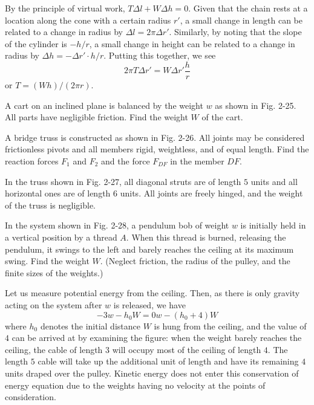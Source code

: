 \documentclass[../feynman-lectures-on-physics.tex]{subfiles}
\begin{document}
\begin{questions}
\begin{solution}
	By the principle of virtual work, $T\Delta{l} + W\Delta{h} = 0$. Given that the chain rests at a location along the cone with a certain radius $r'$, a small change in length can be related to a change in radius by $\Delta{l} = 2\pi\Delta{r'}$. Similarly, by noting that the slope of the cylinder is $-h/r$, a small change in height can be related to a change in radius by $\Delta{h} = -\Delta{r'}\cdot{h}/r$. Putting this together, we see
	\[
	2\pi{T}\Delta{r'} = W\Delta{r'}\frac{h}{r}
	\] 
	or $T = (Wh)/(2\pi{r})$.
\end{solution}

\question A cart on an inclined plane is balanced by the weight $w$ as shown in Fig. 2-25. All parts have negligible friction. Find the weight $W$ of the cart.

\question A bridge truss is constructed as shown in Fig. 2-26. All joints may be considered frictionless pivots and all members rigid, weightless, and of equal length. Find the reaction forces $F_1$ and $F_2$ and the force $F_{DF}$ in the member $DF$.

\question In the truss shown in Fig. 2-27, all diagonal struts are of length $5$ units and all horizontal ones are of length $6$ units. All joints are freely hinged, and the weight of the truss is negligible.

\question In the system shown in Fig. 2-28, a pendulum bob of weight $w$ is initially held in a vertical position by a thread $A$. When this thread is burned, releasing the pendulum, it swings to the left and barely reaches the ceiling at its maximum swing. Find the weight $W$. (Neglect friction, the radius of the pulley, and the finite sizes of the weights.)

\begin{solution}
	Let us measure potential energy from the ceiling. Then, as there is only gravity acting on the system after $w$ is released, we have
	\[
		-3w - h_0W = 0w - (h_0 + 4)W
	\] 
	where $h_0$ denotes the initial distance $W$ is hung from the ceiling, and the value of $4$ can be arrived at by examining the figure: when the weight barely reaches the ceiling, the cable of length $3$ will occupy most of the ceiling of length $4$. The length $5$ cable will take up the additional unit of length and have its remaining $4$ units draped over the pulley. Kinetic energy does not enter this conservation of energy equation due to the weights having no velocity at the points of consideration.


\end{solution}
\end{questions}
\end{document}
